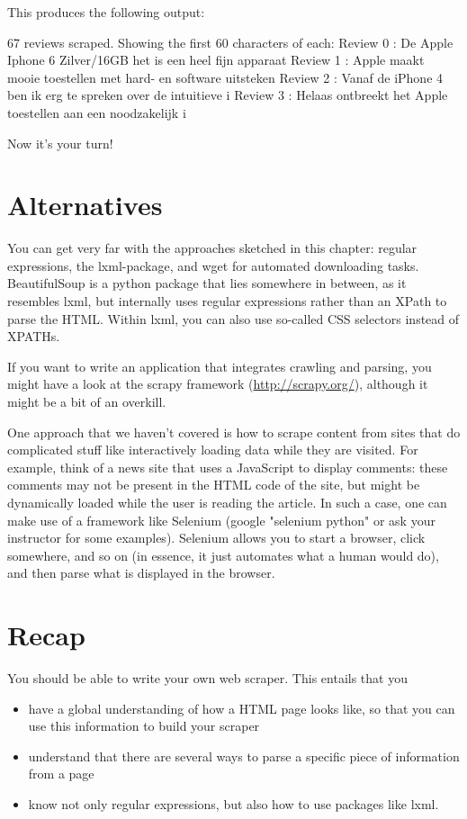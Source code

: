 \documentclass[a4paper,12pt]{book}
\begin{document}
This produces the following output:

\begin{lstlistingoutput}
67 reviews scraped. Showing the first 60 characters of each:
Review 0 : De Apple Iphone 6 Zilver/16GB het is een heel fijn apparaat 
Review 1 : Apple maakt mooie toestellen met hard- en software uitsteken
Review 2 : Vanaf de iPhone 4 ben ik erg te spreken over de intuitieve i
Review 3 : Helaas ontbreekt het Apple toestellen aan een noodzakelijk i
\end{lstlistingoutput}

Now it's your turn!


\section{Alternatives}
You can get very far with the approaches sketched in this chapter: regular expressions, the lxml-package, and wget for automated downloading tasks. BeautifulSoup is a python package that lies somewhere in between, as it resembles lxml, but internally uses regular expressions rather than an XPath to parse the HTML. Within lxml, you can also use so-called CSS selectors instead of XPATHs.

If you want to write an application that integrates crawling and parsing, you might have a look at the scrapy framework (\url{http://scrapy.org/}), although it might be a bit of an overkill.

One approach that we haven't covered is how to scrape content from sites that do complicated stuff like interactively loading data while they are visited. For example, think of a news site that uses a JavaScript to display comments: these comments may not be present in the HTML code of the site, but might be dynamically loaded while the user is reading the article. In such a case, one can make use of a framework like Selenium (google "selenium python" or ask your instructor for some examples). Selenium allows you to start a browser, click somewhere, and so on (in essence, it just automates what a human would do), and then parse what is displayed in the browser. 

\section{Recap}
You should be able to write your own web scraper. This entails that you
\begin{itemize}
	\item have a global understanding of how a HTML page looks like, so that you can use this information to build your scraper
	\item understand that there are several ways to parse a specific piece of information from a page
	\item know not only regular expressions, but also how to use packages like lxml.
\end{itemize}
\end{document}
